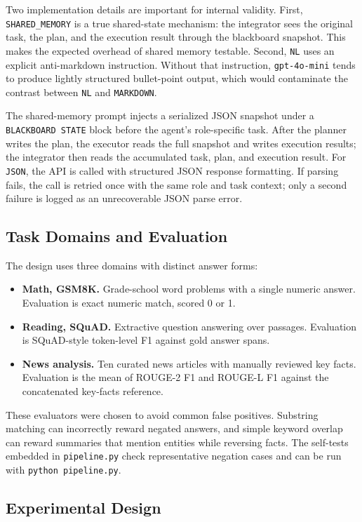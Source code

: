 \documentclass[11pt]{article}
\newcommand{\NL}{\texttt{NL}\xspace}
\newcommand{\MD}{\texttt{MARKDOWN}\xspace}
\newcommand{\JS}{\texttt{JSON}\xspace}
\newcommand{\SM}{\texttt{SHARED\_MEMORY}\xspace}
\begin{document}
Two implementation details are important for internal validity. First, \SM is a true shared-state mechanism: the integrator sees the original task, the plan, and the execution result through the blackboard snapshot. This makes the expected overhead of shared memory testable. Second, \NL uses an explicit anti-markdown instruction. Without that instruction, \texttt{gpt-4o-mini} tends to produce lightly structured bullet-point output, which would contaminate the contrast between \NL and \MD.

The shared-memory prompt injects a serialized JSON snapshot under a \texttt{BLACKBOARD STATE} block before the agent's role-specific task. After the planner writes the plan, the executor reads the full snapshot and writes execution results; the integrator then reads the accumulated task, plan, and execution result. For \JS, the API is called with structured JSON response formatting. If parsing fails, the call is retried once with the same role and task context; only a second failure is logged as an unrecoverable JSON parse error.

\subsection{Task Domains and Evaluation}

The design uses three domains with distinct answer forms:

\begin{itemize}
  \item \textbf{Math, GSM8K.} Grade-school word problems with a single numeric answer. Evaluation is exact numeric match, scored 0 or 1.
  \item \textbf{Reading, SQuAD.} Extractive question answering over passages. Evaluation is SQuAD-style token-level F1 against gold answer spans.
  \item \textbf{News analysis.} Ten curated news articles with manually reviewed key facts. Evaluation is the mean of ROUGE-2 F1 and ROUGE-L F1 against the concatenated key-facts reference.
\end{itemize}

These evaluators were chosen to avoid common false positives. Substring matching can incorrectly reward negated answers, and simple keyword overlap can reward summaries that mention entities while reversing facts. The self-tests embedded in \texttt{pipeline.py} check representative negation cases and can be run with \texttt{python pipeline.py}.

\subsection{Experimental Design}
\end{document}
